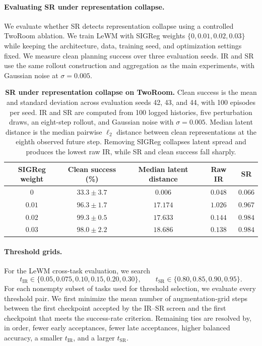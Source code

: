 \documentclass[10pt]{article}
\begin{document}
\paragraph{Evaluating SR under representation collapse.}
\label{sec:appendix-sigreg-collapse}
We evaluate whether SR detects representation collapse using a controlled
TwoRoom ablation. We train LeWM with SIGReg weights
$\{0,0.01,0.02,0.03\}$ while keeping the architecture, data, training seed,
and optimization settings fixed. We measure clean planning success over three
evaluation seeds. IR and SR use the same rollout construction and aggregation
as the main experiments, with Gaussian noise at $\sigma=0.005$.

\begin{table}[H]
\centering
\small
\setlength{\tabcolsep}{6pt}
\caption{\textbf{SR under representation collapse on TwoRoom.}
Clean success is the mean and standard deviation across evaluation seeds
42, 43, and 44, with 100 episodes per seed. IR and SR are computed from
100 logged histories, five perturbation draws, an eight-step rollout, and
Gaussian noise with $\sigma=0.005$. Median latent distance is the median
pairwise $\ell_2$ distance between clean representations at the eighth
observed future step. Removing SIGReg collapses latent spread and produces the
lowest raw IR, while SR and clean success fall sharply.}
\label{tab:sigreg-collapse-control}
\begin{tabular}{@{}ccccc@{}}
\toprule
SIGReg weight
& Clean success (\%)
& Median latent distance
& Raw IR
& SR \\
\midrule
$0$
& $33.3 \pm 3.7$
& $0.006$
& $0.048$
& $0.066$ \\
$0.01$
& $96.3 \pm 1.7$
& $17.174$
& $1.026$
& $0.967$ \\
$0.02$
& $99.3 \pm 0.5$
& $17.633$
& $0.144$
& $0.984$ \\
$0.03$
& $98.0 \pm 2.2$
& $18.686$
& $0.138$
& $0.984$ \\
\bottomrule
\end{tabular}
\end{table}

\paragraph{Threshold grids.}
For the LeWM cross-task evaluation, we search
\[
t_{\mathrm{IR}}\in\{0.05,0.075,0.10,0.15,0.20,0.30\},
\qquad
t_{\mathrm{SR}}\in\{0.80,0.85,0.90,0.95\}.
\]
For each nonempty subset of tasks used for threshold selection, we evaluate
every threshold pair. We first minimize the mean number of augmentation-grid
steps between the first checkpoint accepted by the IR--SR screen and the
first checkpoint that meets the success-rate criterion. Remaining ties are
resolved by, in order, fewer early acceptances, fewer late acceptances, higher
balanced accuracy, a smaller $t_{\mathrm{IR}}$, and a larger
$t_{\mathrm{SR}}$.
\end{document}
